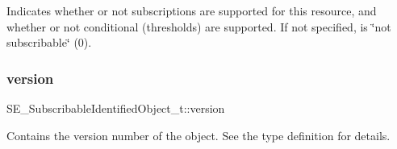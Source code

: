 Indicates whether or not subscriptions are supported for this resource, and whether or not conditional (thresholds) are supported. If not specified, is \char`\"{}not subscribable\char`\"{} (0). \mbox{\label{group__SubscribableIdentifiedObject_gac02228152f017ea425ff1f68de5d7832}} 
\subsubsection{\texorpdfstring{version}{version}}
{\footnotesize\ttfamily S\+E\+\_\+\+Subscribable\+Identified\+Object\+\_\+t\+::version}

Contains the version number of the object. See the type definition for details. 
